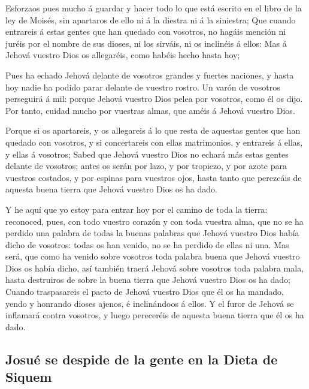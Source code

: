  Esforzaos pues mucho á guardar y hacer todo lo que está
escrito en el libro de la ley de Moisés, sin apartaros de ello ni á la
diestra ni á la siniestra;  Que cuando entrareis á estas
gentes que han quedado con vosotros, no hagáis mención ni juréis por el
nombre de sus dioses, ni los sirváis, ni os inclinéis á ellos:
 Mas á Jehová vuestro Dios os allegaréis, como habéis
hecho hasta hoy;

 Pues ha echado Jehová delante de vosotros grandes y
fuertes naciones, y hasta hoy nadie ha podido parar delante de vuestro
rostro.  Un varón de vosotros perseguirá á mil: porque
Jehová vuestro Dios pelea por vosotros, como él os dijo. 
Por tanto, cuidad mucho por vuestras almas, que améis á Jehová vuestro
Dios.

 Porque si os apartareis, y os allegareis á lo que resta
de aquestas gentes que han quedado con vosotros, y si concertareis con
ellas matrimonios, y entrareis á ellas, y ellas á vosotros;
 Sabed que Jehová vuestro Dios no echará más estas gentes
delante de vosotros; antes os serán por lazo, y por tropiezo, y por
azote para vuestros costados, y por espinas para vuestros ojos, hasta
tanto que perezcáis de aquesta buena tierra que Jehová vuestro Dios os
ha dado.

 Y he aquí que yo estoy para entrar hoy por el camino de
toda la tierra: reconoced, pues, con todo vuestro corazón y con toda
vuestra alma, que no se ha perdido una palabra de todas la buenas
palabras que Jehová vuestro Dios había dicho de vosotros: todas os han
venido, no se ha perdido de ellas ni una.  Mas será, que
como ha venido sobre vosotros toda palabra buena que Jehová vuestro Dios
os había dicho, así también traerá Jehová sobre vosotros toda palabra
mala, hasta destruiros de sobre la buena tierra que Jehová vuestro Dios
os ha dado;  Cuando traspasareis el pacto de Jehová
vuestro Dios que él os ha mandado, yendo y honrando dioses ajenos, é
inclinándoos á ellos. Y el furor de Jehová se inflamará contra vosotros,
y luego pereceréis de aquesta buena tierra que él os ha dado.

\hypertarget{josuuxe9-se-despide-de-la-gente-en-la-dieta-de-siquem}{%
\subsection{Josué se despide de la gente en la Dieta de
Siquem}\label{josuuxe9-se-despide-de-la-gente-en-la-dieta-de-siquem}}

